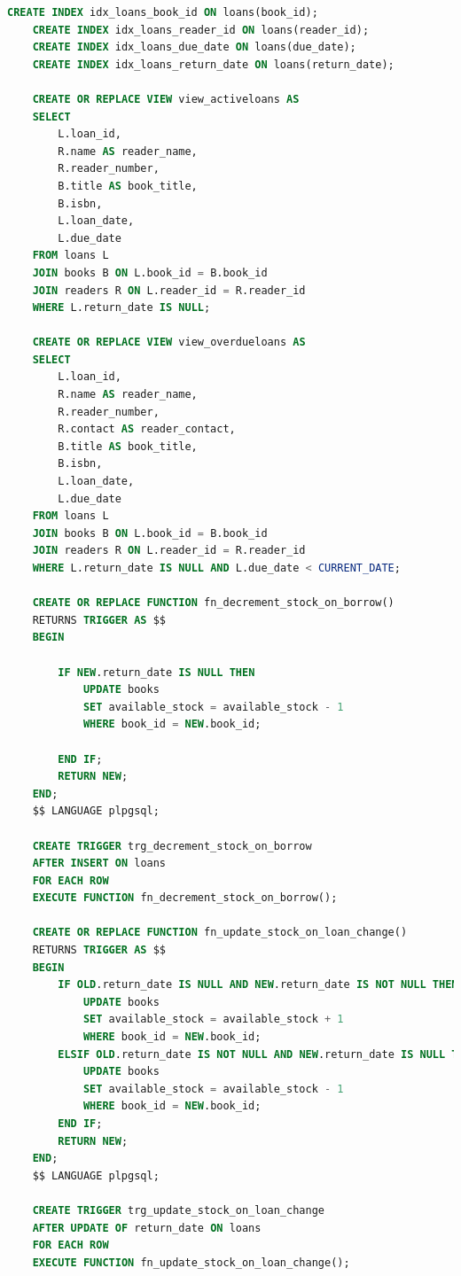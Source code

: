 \documentclass[11pt, a4paper]{article}
\begin{document}
\begin{lstlisting}[language=SQL, style=sqlstyle, caption={personal\_library/schema.sql SQL脚本}, label={lst:schema_sql}]
    CREATE INDEX idx_loans_book_id ON loans(book_id);
    CREATE INDEX idx_loans_reader_id ON loans(reader_id);
    CREATE INDEX idx_loans_due_date ON loans(due_date);
    CREATE INDEX idx_loans_return_date ON loans(return_date);
    
    CREATE OR REPLACE VIEW view_activeloans AS
    SELECT
        L.loan_id,
        R.name AS reader_name,
        R.reader_number,
        B.title AS book_title,
        B.isbn,
        L.loan_date,
        L.due_date
    FROM loans L
    JOIN books B ON L.book_id = B.book_id
    JOIN readers R ON L.reader_id = R.reader_id
    WHERE L.return_date IS NULL;
    
    CREATE OR REPLACE VIEW view_overdueloans AS
    SELECT
        L.loan_id,
        R.name AS reader_name,
        R.reader_number,
        R.contact AS reader_contact,
        B.title AS book_title,
        B.isbn,
        L.loan_date,
        L.due_date
    FROM loans L
    JOIN books B ON L.book_id = B.book_id
    JOIN readers R ON L.reader_id = R.reader_id
    WHERE L.return_date IS NULL AND L.due_date < CURRENT_DATE;
    
    CREATE OR REPLACE FUNCTION fn_decrement_stock_on_borrow()
    RETURNS TRIGGER AS $$
    BEGIN
    
        IF NEW.return_date IS NULL THEN
            UPDATE books
            SET available_stock = available_stock - 1
            WHERE book_id = NEW.book_id;
    
        END IF;
        RETURN NEW;
    END;
    $$ LANGUAGE plpgsql;
    
    CREATE TRIGGER trg_decrement_stock_on_borrow
    AFTER INSERT ON loans
    FOR EACH ROW
    EXECUTE FUNCTION fn_decrement_stock_on_borrow();
    
    CREATE OR REPLACE FUNCTION fn_update_stock_on_loan_change()
    RETURNS TRIGGER AS $$
    BEGIN
        IF OLD.return_date IS NULL AND NEW.return_date IS NOT NULL THEN
            UPDATE books
            SET available_stock = available_stock + 1
            WHERE book_id = NEW.book_id; 
        ELSIF OLD.return_date IS NOT NULL AND NEW.return_date IS NULL THEN
            UPDATE books
            SET available_stock = available_stock - 1
            WHERE book_id = NEW.book_id;
        END IF;
        RETURN NEW;
    END;
    $$ LANGUAGE plpgsql;
    
    CREATE TRIGGER trg_update_stock_on_loan_change
    AFTER UPDATE OF return_date ON loans 
    FOR EACH ROW
    EXECUTE FUNCTION fn_update_stock_on_loan_change();
    

\end{lstlisting}
\end{document}
